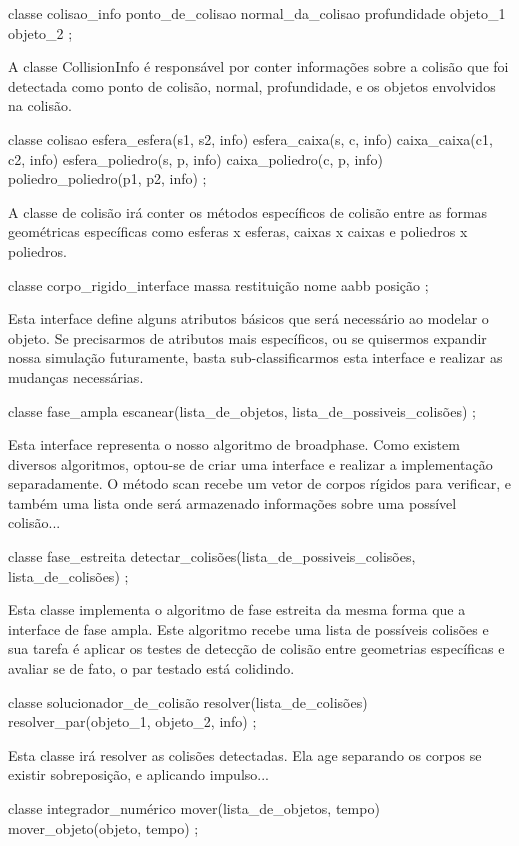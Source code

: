 classe colisao_info
{
ponto_de_colisao
normal_da_colisao
profundidade
objeto_1
objeto_2
};

A classe CollisionInfo é responsável por conter informações sobre a colisão que
foi detectada como ponto de colisão, normal, profundidade, e os objetos
envolvidos na colisão.

classe colisao
{
esfera_esfera(s1, s2, info)
esfera_caixa(s, c, info)
caixa_caixa(c1, c2, info)
esfera_poliedro(s, p, info)
caixa_poliedro(c, p, info)
poliedro_poliedro(p1, p2, info)
};

A classe de colisão irá conter os métodos específicos de colisão entre as
formas geométricas específicas como esferas x esferas, caixas x caixas e
poliedros x poliedros.

classe corpo_rigido_interface
    {
massa
restituição
nome
aabb
posição
    };

Esta interface define alguns atributos básicos que será necessário ao modelar o
objeto. Se precisarmos de atributos mais específicos, ou se quisermos expandir
nossa simulação futuramente, basta sub-classificarmos esta interface e realizar
as mudanças necessárias.

classe fase_ampla
{
escanear(lista_de_objetos, lista_de_possiveis_colisões)
};

Esta interface representa o nosso algoritmo de broadphase. Como existem
diversos algoritmos, optou-se de criar uma interface e realizar a implementação
separadamente.
O método scan recebe um vetor de corpos rígidos para verificar, e também uma
lista onde será armazenado informações sobre uma possível colisão...

classe fase_estreita
    {
detectar_colisões(lista_de_possiveis_colisões, lista_de_colisões)
    };

Esta classe implementa o algoritmo de fase estreita da mesma forma que a interface
de fase ampla. Este algoritmo recebe uma lista de possíveis colisões e sua
tarefa é aplicar os testes de detecção de colisão entre geometrias específicas
e avaliar se de fato, o par testado está colidindo.

classe solucionador_de_colisão
    {
resolver(lista_de_colisões)
resolver_par(objeto_1, objeto_2, info)
    };

Esta classe irá resolver as colisões detectadas. Ela age separando os corpos se
existir sobreposição, e aplicando impulso...

classe integrador_numérico
{
mover(lista_de_objetos, tempo)
mover_objeto(objeto, tempo)
};


